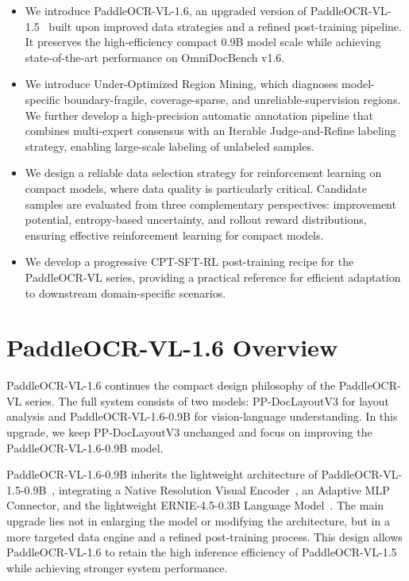 \documentclass[11pt, a4paper,logo,  copyright, nonumbering]{paddleocr}
\begin{document}
\begin{itemize}
    \item We introduce PaddleOCR-VL-1.6, an upgraded version of PaddleOCR-VL-1.5~\cite{cui2026paddleocrvl15multitask09bvlm} built upon improved data strategies and a refined post-training pipeline. It preserves the high-efficiency compact 0.9B model scale while achieving state-of-the-art performance on OmniDocBench v1.6.
    
    \item We introduce Under-Optimized Region Mining, which diagnoses model-specific boundary-fragile, coverage-sparse, and unreliable-supervision regions. We further develop a high-precision automatic annotation pipeline that combines multi-expert consensus with an Iterable Judge-and-Refine labeling strategy, enabling large-scale labeling of unlabeled samples.
    
    \item We design a reliable data selection strategy for reinforcement learning on compact models, where data quality is particularly critical. Candidate samples are evaluated from three complementary perspectives: improvement potential, entropy-based uncertainty, and rollout reward distributions, ensuring effective reinforcement learning for compact models.
    
    \item We develop a progressive CPT-SFT-RL post-training recipe for the PaddleOCR-VL series, providing a practical reference for efficient adaptation to downstream domain-specific scenarios.
\end{itemize}



\section{PaddleOCR-VL-1.6 Overview}
\label{Architecture PaddleOCR-VL}

PaddleOCR-VL-1.6 continues the compact design philosophy of the PaddleOCR-VL series. The full system consists of two models: PP-DocLayoutV3 for layout analysis and PaddleOCR-VL-1.6-0.9B for vision-language understanding. In this upgrade, we keep PP-DocLayoutV3 unchanged and focus on improving the PaddleOCR-VL-1.6-0.9B model. 

PaddleOCR-VL-1.6-0.9B inherits the lightweight architecture of PaddleOCR-VL-1.5-0.9B~\cite{cui2025paddleocrvl}, integrating a Native Resolution Visual Encoder~\cite{dehghani2023patch}, an Adaptive MLP Connector, and the lightweight ERNIE-4.5-0.3B Language Model~\cite{ernie2025technicalreport}. The main upgrade lies not in enlarging the model or modifying the architecture, but in a more targeted data engine and a refined post-training process. This design allows PaddleOCR-VL-1.6 to retain the high inference efficiency of PaddleOCR-VL-1.5 while achieving stronger system performance.
\end{document}
